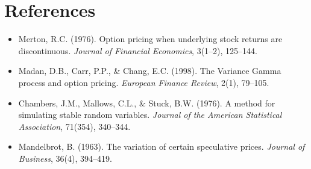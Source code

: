 \documentclass[11pt]{article}
\begin{document}
\section*{References}
\small
\begin{itemize}
\item[] Merton, R.C. (1976). Option pricing when underlying stock returns are discontinuous. \textit{Journal of Financial Economics}, 3(1--2), 125--144.
\item[] Madan, D.B., Carr, P.P., \& Chang, E.C. (1998). The Variance Gamma process and option pricing. \textit{European Finance Review}, 2(1), 79--105.
\item[] Chambers, J.M., Mallows, C.L., \& Stuck, B.W. (1976). A method for simulating stable random variables. \textit{Journal of the American Statistical Association}, 71(354), 340--344.
\item[] Mandelbrot, B. (1963). The variation of certain speculative prices. \textit{Journal of Business}, 36(4), 394--419.
\end{itemize}
\end{document}
